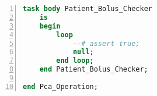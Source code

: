 \begin{lstlisting}[language=ada, gobble=0, numbers=left, caption={\lstinline{Pca_Operation} package}, label={listing:pca_generated:pca_operation}]
    task body Patient_Bolus_Checker
    is
    begin
        loop
            --# assert true;
            null;
        end loop;
    end Patient_Bolus_Checker;

end Pca_Operation;
\end{lstlisting} 
\doublespacing

